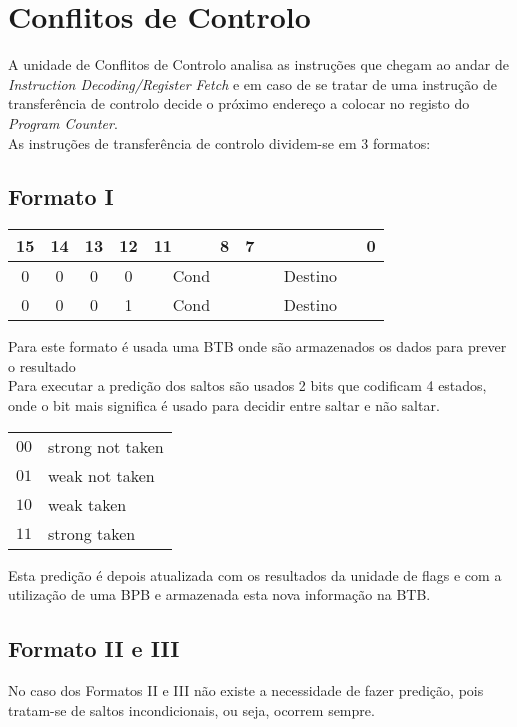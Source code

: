 \chapter{Conflitos de Controlo}
A unidade de Conflitos de Controlo analisa as instruções que chegam ao andar de \textit{Instruction Decoding/Register Fetch} e em caso de se tratar de uma instrução de transferência de controlo decide o próximo endereço a colocar no registo do \textit{Program Counter}.\\

As instruções de transferência de controlo dividem-se em 3 formatos:\\

\section{Formato I}
\begin{table}[H]
	\centering
	\begin{tabular}{cccccccccccccccc}
		15 & 14 & 13 & 12 & 11 &  &  & 8 & 7 &  &  &  &  &  &  & 0 \\ \hline
		\multicolumn{1}{|c}{0} & \multicolumn{1}{c|}{0} & 0 & \multicolumn{1}{c|}{0} & \multicolumn{4}{c|}{Cond} & \multicolumn{8}{c|}{Destino} \\ \hline
		\multicolumn{1}{|c}{0} & \multicolumn{1}{c|}{0} & 0 & \multicolumn{1}{c|}{1} & \multicolumn{4}{c|}{Cond} & \multicolumn{8}{c|}{Destino} \\ \hline
	\end{tabular}
\end{table}
Para este formato é usada uma BTB onde são armazenados os dados para prever o resultado \\
Para executar a predição dos saltos são usados 2 bits que codificam 4 estados, onde o bit mais significa é usado para decidir entre saltar e não saltar.
\begin{table}[H]
	\begin{tabular}{ll}
		$00$ & strong not taken	\\
		$01$ & weak not taken	\\
		$10$ & weak taken		\\
		$11$ & strong taken
	\end{tabular}
\end{table}
Esta predição é depois atualizada com os resultados da unidade de flags e com a utilização de uma BPB e armazenada esta nova informação na BTB.

\section{Formato II e III}
No caso dos Formatos II e III não existe a necessidade de fazer predição, pois tratam-se de saltos incondicionais, ou seja, ocorrem sempre.\\


